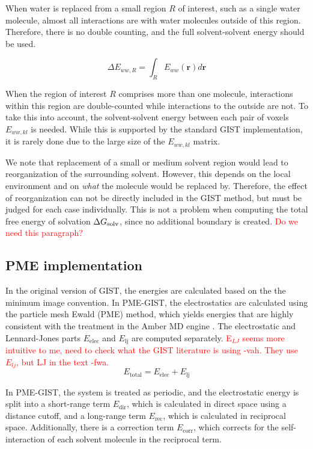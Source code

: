 \documentclass[9pt,tutorial]{livecoms}
\newcommand{\dgsolv}{\Delta G_\textup{solv}}
\newcommand{\todo}{\textcolor{red}}
\begin{document}
When water is replaced from a small region $R$ of interest, such as a single water molecule, almost all interactions are with water molecules outside of this region.
Therefore, there is no double counting, and the full solvent-solvent energy should be used.

\begin{equation}
\Delta E_{ww,R} = \int_R E_{ww}(\textbf{r}) d\textbf{r}
\end{equation}

When the region of interest $R$ comprises more than one molecule, interactions within this region are double-counted while interactions to the outside are not.
To take this into account, the solvent-solvent energy between each pair of voxels $E_{ww,kl}$ is needed.
While this is supported by the standard GIST implementation, it is rarely done due to the large size of the $E_{ww,kl}$ matrix.

We note that replacement of a small or medium solvent region would lead to reorganization of the surrounding solvent.
However, this depends on the local environment and on \emph{what} the molecule would be replaced by.
Therefore, the effect of reorganization can not be directly included in the GIST method, but must be judged for each case individually.
This is not a problem when computing the total free energy of solvation $\dgsolv$, since no additional boundary is created.
\todo{Do we need this paragraph?}



\subsection{PME implementation}

In the original version of GIST, the energies are calculated based on the the minimum image convention.
In PME-GIST, the electrostatics are calculated using the particle mesh Ewald (PME) method, which yields energies that are highly consistent with the treatment in the Amber MD engine \cite{Chen2021}.
The electrostatic and Lennard-Jones parts $E_\text{elec}$ and $E_\text{lj}$ are computed separately.
\todo{E$_{LJ}$ seems more intuitive to me, need to check what the GIST literature is using -vah. They use $E_{lj}$, but LJ in the text -fwa.}
\begin{equation}
	E_\text{total} = E_\text{elec} + E_\text{lj}
\end{equation}

In PME-GIST, the system is treated as periodic, and the electrostatic energy is split into a short-range term $E_\text{dir}$, which is calculated in direct space using a distance cutoff, and a long-range term $E_\text{rec}$, which is calculated in reciprocal space.
Additionally, there is a correction term $E_\text{corr}$, which corrects for the self-interaction of each solvent molecule in the reciprocal term.
\end{document}
